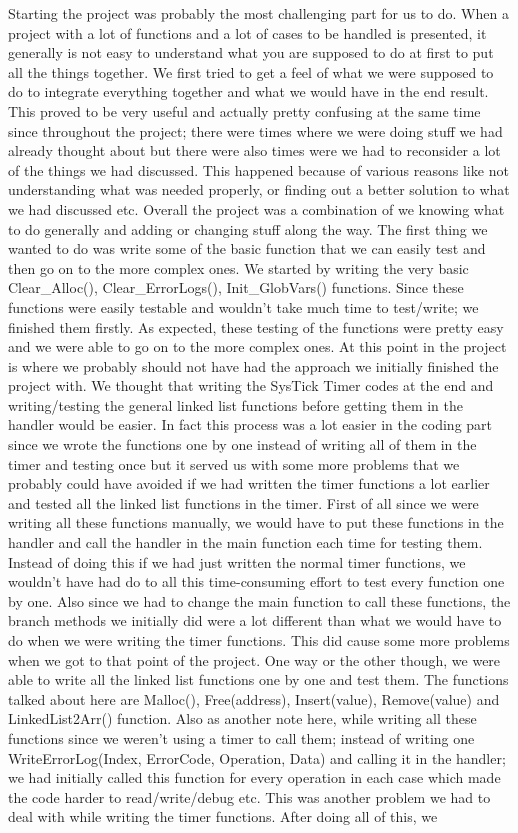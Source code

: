 \documentclass[pdftex,12pt,a4paper]{article}
\begin{document}
Starting the project was probably the most challenging part for us to do. When a project with a lot of functions and a lot of cases to be handled is presented, it generally is not easy to understand what you are supposed to do at first to put all the things together. We first tried to get a feel of what we were supposed to do to integrate everything together and what we would have in the end result. This proved to be very useful and actually pretty confusing at the same time since throughout the project; there were times where we were doing stuff we had already thought about but there were also times were we had to reconsider a lot of the things we had discussed. This happened because of various reasons like not understanding what was needed properly, or finding out a better solution to what we had discussed etc. Overall the project was a combination of we knowing what to do generally and adding or changing stuff along the way. The first thing we wanted to do was write some of the basic function that we can easily test and then go on to the more complex ones. We started by writing the very basic Clear\_Alloc(), Clear\_ErrorLogs(), Init\_GlobVars() functions. Since these functions were easily testable and wouldn't take much time to test/write; we finished them firstly. As expected, these testing of the functions were pretty easy and we were able to go on to the more complex ones. At this point in the project is where we probably should not have had the approach we initially finished the project with. We thought that writing the SysTick Timer codes at the end and writing/testing the general linked list functions before getting them in the handler would be easier. In fact this process was a lot easier in the coding part since we wrote the functions one by one instead of writing all of them in the timer and testing once but it served us with some more problems that we probably could have avoided if we had written the timer functions a lot earlier and tested all the linked list functions in the timer. First of all since we were writing all these functions manually, we would have to put these functions in the handler and call the handler in the main function each time for testing them. Instead of doing this if we had just written the normal timer functions, we wouldn't have had do to all this time-consuming effort to test every function one by one. Also since we had to change the main function to call these functions, the branch methods we initially did were a lot different than what we would have to do when we were writing the timer functions. This did cause some more problems when we got to that point of the project. One way or the other though, we were able to write all the linked list functions one by one and test them. The functions talked about here are Malloc(), Free(address), Insert(value), Remove(value) and LinkedList2Arr() function. Also as another note here, while writing all these functions since we weren't using a timer to call them; instead of writing one WriteErrorLog(Index, ErrorCode, Operation, Data) and calling it in the handler; we had initially called this function for every operation in each case which made the code harder to read/write/debug etc. This was another problem we had to deal with while writing the timer functions. After doing all of this, we 
\end{document}
